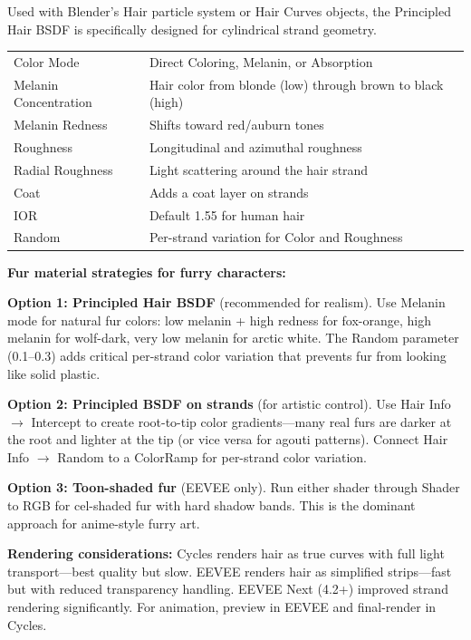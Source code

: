 Used with Blender's Hair particle system or Hair Curves objects, the
Principled Hair BSDF is specifically designed for cylindrical strand
geometry.

\begin{center}
\begin{tabularx}{\textwidth}{L{3.5cm}X}
\toprule
{}
 &  \\
\midrule
Color Mode & Direct Coloring, Melanin, or Absorption \\
Melanin Concentration & Hair color from blonde (low) through brown to black (high) \\
Melanin Redness & Shifts toward red/auburn tones \\
Roughness & Longitudinal and azimuthal roughness \\
Radial Roughness & Light scattering around the hair strand \\
Coat & Adds a coat layer on strands \\
IOR & Default 1.55 for human hair \\
Random & Per-strand variation for Color and Roughness \\
\bottomrule
\end{tabularx}
\end{center}

\begin{furrybox}
\textbf{Fur material strategies for furry characters:}

\textbf{Option 1: Principled Hair BSDF} (recommended for realism).
Use Melanin mode for natural fur colors: low melanin + high redness
for fox-orange, high melanin for wolf-dark, very low melanin for
arctic white. The Random parameter (0.1--0.3) adds critical
per-strand color variation that prevents fur from looking like
solid plastic.

\textbf{Option 2: Principled BSDF on strands} (for artistic control).
Use Hair Info $\rightarrow$ Intercept to create root-to-tip color
gradients---many real furs are darker at the root and lighter at
the tip (or vice versa for agouti patterns). Connect Hair Info
$\rightarrow$ Random to a ColorRamp for per-strand color variation.

\textbf{Option 3: Toon-shaded fur} (EEVEE only). Run either shader
through Shader to RGB for cel-shaded fur with hard shadow bands.
This is the dominant approach for anime-style furry art.

\textbf{Rendering considerations:} Cycles renders hair as true
curves with full light transport---best quality but slow. EEVEE
renders hair as simplified strips---fast but with reduced
transparency handling. EEVEE Next (4.2+) improved strand rendering
significantly. For animation, preview in EEVEE and final-render in
Cycles.
\end{furrybox}

